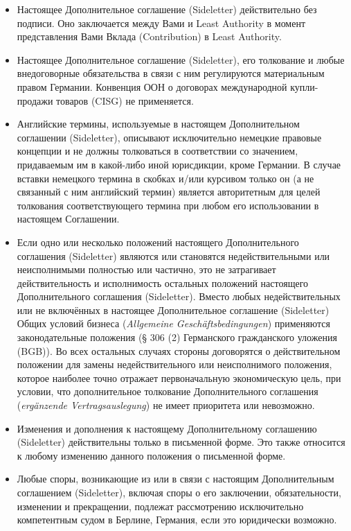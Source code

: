 \begin{itemize}
\item[(1)] Настоящее Дополнительное соглашение (Sideletter) действительно без подписи. Оно заключается между Вами и Least Authority в момент представления Вами Вклада (Contribution) в Least Authority. 
\item[(2)] Настоящее Дополнительное соглашение (Sideletter), его толкование и любые внедоговорные обязательства в связи с ним регулируются материальным правом Германии. Конвенция ООН о договорах международной купли-продажи товаров (CISG) не применяется.
\item[(3)] Английские термины, используемые в настоящем Дополнительном соглашении (Sideletter), описывают исключительно немецкие правовые концепции и не должны толковаться в соответствии со значением, придаваемым им в какой-либо иной юрисдикции, кроме Германии. В случае вставки немецкого термина в скобках и/или курсивом только он (а не связанный с ним английский термин) является авторитетным для целей толкования соответствующего термина при любом его использовании в настоящем Соглашении.
\item[(4)] Если одно или несколько положений настоящего Дополнительного соглашения (Sideletter) являются или становятся недействительными или неисполнимыми полностью или частично, это не затрагивает действительность и исполнимость остальных положений настоящего Дополнительного соглашения (Sideletter). Вместо любых недействительных или не включённых в настоящее Дополнительное соглашение (Sideletter) Общих условий бизнеса (\textsl{Allgemeine Geschäftsbedingungen}) применяются законодательные положения (§ 306 (2) Германского гражданского уложения (BGB)). Во всех остальных случаях стороны договорятся о действительном положении для замены недействительного или неисполнимого положения, которое наиболее точно отражает первоначальную экономическую цель, при условии, что дополнительное толкование Дополнительного соглашения (\textsl{ergänzende Vertragsauslegung}) не имеет приоритета или невозможно.
\item[(5)] Изменения и дополнения к настоящему Дополнительному соглашению (Sideletter) действительны только в письменной форме. Это также относится к любому изменению данного положения о письменной форме. 
\item[(6)] Любые споры, возникающие из или в связи с настоящим Дополнительным соглашением (Sideletter), включая споры о его заключении, обязательности, изменении и прекращении, подлежат рассмотрению исключительно компетентным судом в Берлине, Германия, если это юридически возможно.
\end{itemize}
